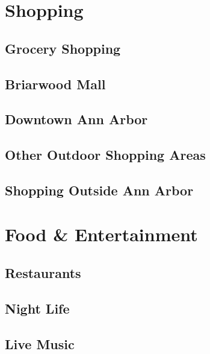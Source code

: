 \documentclass[
]{book}
\begin{document}
\hypertarget{shopping}{%
\chapter{Shopping}\label{shopping}}

\hypertarget{grocery-shopping}{%
\section{Grocery Shopping}\label{grocery-shopping}}

\hypertarget{briarwood-mall}{%
\section{Briarwood Mall}\label{briarwood-mall}}

\hypertarget{downtown-ann-arbor}{%
\section{Downtown Ann Arbor}\label{downtown-ann-arbor}}

\hypertarget{other-outdoor-shopping-areas}{%
\section{Other Outdoor Shopping Areas}\label{other-outdoor-shopping-areas}}

\hypertarget{shopping-outside-ann-arbor}{%
\section{Shopping Outside Ann Arbor}\label{shopping-outside-ann-arbor}}

\hypertarget{food-entertainment}{%
\chapter{Food \& Entertainment}\label{food-entertainment}}

\hypertarget{restaurants}{%
\section{Restaurants}\label{restaurants}}

\hypertarget{night-life}{%
\section{Night Life}\label{night-life}}

\hypertarget{live-music}{%
\section{Live Music}\label{live-music}}
\end{document}
